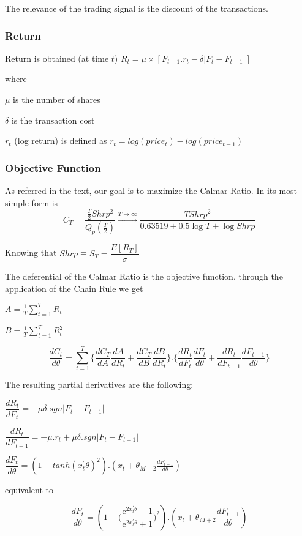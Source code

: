 \documentclass[parskip=full]{scrartcl}
\begin{document}
The relevance of the trading signal is the discount of the transactions.

\subsubsection{Return}

Return is obtained (at time $ t $)
$ R_t = \mu \times [F_{t-1}.r_t - \delta|F_t-F_{t-1}|]$

where

\qquad $\mu$ is the number of shares

\qquad$\delta$ is the transaction cost
		
\qquad$r_t$ (log return) is defined as $ r_t = log(price_t) - log(price_{t-1})$

\subsubsection{Objective Function}

As referred in the text, our goal is to maximize the Calmar Ratio. In its most simple form is
$$ C_T = \frac{\frac{T}{2}Shrp^2}{Q_p(\frac{T}{2})} \xrightarrow{T \to \infty}  \frac{T Shrp^2}{0.63519 + 0.5\log T + \log Shrp}$$

Knowing that  $Shrp \equiv S_T = \dfrac{E[R_T]}{\sigma}$

The deferential of the Calmar Ratio is the objective function. through the application of the Chain Rule we get \cite{moody1998performance,almahdi2017adaptive}

$ A = \frac{1}{T}\sum_{t=1}^{T}R_t $

$ B = \frac{1}{T}\sum_{t=1}^{T}R_{t}^{2} $


$$ \frac{dC_t}{d\theta} = \sum_{t=1}^{T}  \{\frac{dC_T}{dA}\frac{dA}{dR_t}+\frac{dC_T}{dB}\frac{dB}{dR_t}\}.\{\frac{dR_t}{dF_t}\frac{dF_t}{d\theta}+\frac{dR_t}{dF_{t-1}}\frac{dF_{t-1}}{d\theta}\} $$

The resulting partial derivatives are the following:

$ \dfrac{dR_t}{dF_t} = -\mu\delta.sgn|F_t - F_{t-1}| $

$ \dfrac{dR_t}{dF_{t-1}} = -\mu.r_t+\mu\delta.sgn|F_t - F_{t-1}| $

$ \dfrac{dF_t}{d\theta} = (1-tanh(x_{t}^{'}\theta)^2).(x_t + \theta_{M+2}\frac{dF_{t-1}}{d\theta}) $

\qquad equivalent to

$$ \dfrac{dF_t}{d\theta} = (1-\bigg(\dfrac{\mathrm{e}^{2x_{t}^{'}\theta}-1}{\mathrm{e}^{2x_{t}^{'}\theta}+1}\bigg)^2).(x_t + \theta_{M+2}\frac{dF_{t-1}}{d\theta}) $$
\end{document}
